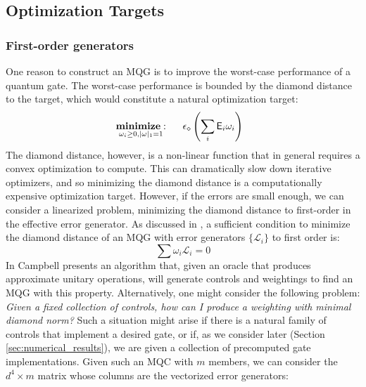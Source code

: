\documentclass[aps,nofootinbib,pra,notitlepage,twocolumn]{revtex4-1}
\begin{document}
\subsection{Optimization Targets}
\subsubsection{First-order generators} %
\label{sub:first_order_generators}

One reason to construct an MQG is to improve the worst-case performance of a quantum gate. The worst-case performance is bounded by the diamond distance to the target, which would constitute a natural optimization target:
\begin{equation}\label{eq:ddmin}
  \begin{split}
    &\underset{\omega_i\geq0, |\omega|_1=1}{\textbf{minimize}: } \hspace{.5cm} \epsilon_\diamond\left(\sum_i\mathsf{E}_i \omega_i\right)
  \end{split}
\end{equation}
The diamond distance, however, is a non-linear function that in general requires a convex optimization to compute\cite{watrous2018theory}. This can dramatically slow down iterative optimizers, and so minimizing the diamond distance is a computationally expensive optimization target. However, if the errors are small enough, we can consider a linearized problem, minimizing the diamond distance to first-order in the effective error generator. As discussed in \cite{Campbell2017}, a sufficient condition to minimize the diamond distance of an MQG with error generators $\{\mathcal{L}_i\}$ to first order is:
\begin{equation}\label{eq:campbell-condition}
\sum \omega_i \mathcal{L}_i = 0
\end{equation}
In \cite{Campbell2017} Campbell presents an algorithm that, given an oracle that produces approximate unitary operations, will generate controls and weightings to find an MQG with this property. Alternatively, one might consider the following problem: \textit{Given a fixed collection of controls, how can I produce a weighting with minimal diamond norm?} Such a situation might arise if there is a natural family of controls that implement a desired gate, or if, as we consider later (Section \ref{sec:numerical_results}), we are given a collection of precomputed gate implementations. Given such an MQC with $m$ members, we can consider the $d^4\times m$ matrix whose columns are the vectorized error generators:
\end{document}
